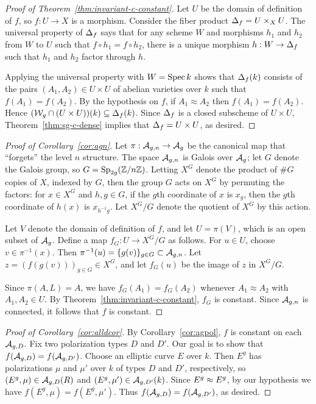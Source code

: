 \documentclass{amsart}
\begin{document}
\begin{proof}[Proof of Theorem~\ref{thm:invariant-c-constant}]
  Let $U$ be the domain of definition of $f$, so $f: U \to X$ is a morphism. Consider the fiber product $\Delta_f = U \times_X U$.
  The universal property of $\Delta_f$ says that for any scheme $W$ and morphisms $h_1$ and $h_2$ from $W$ to $U$ such that $f \circ h_1 = f \circ h_2$, there is a unique morphism $h: W \to \Delta_f$ such that $h_1$ and $h_2$ factor through $h$.

  Applying the universal property with $W = \operatorname{Spec} k$ shows that $\Delta_f(k)$ consists of the pairs $(A_1,A_2) \in U \times U$ of abelian varieties over $k$ such that $f(A_1) = f(A_2)$.
  By the hypothesis on $f$, if $A_1 \approx A_2$ then $f(A_1) = f(A_2)$. Hence $(\mathcal{W}_g \cap (U \times U))(k) \subseteq \Delta_f(k)$.
  Since $\Delta_f$ is a closed subscheme of $U \times U$, Theorem~\ref{thm:sg-c-dense} implies that $\Delta_f = U \times U$, as desired.
\end{proof}

\begin{proof}[Proof of Corollary~\ref{cor:agn}]
  Let $\pi: \mathcal{A}_{g,n} \to \mathcal{A}_g$ be the canonical map that ``forgets'' the level $n$ structure. The space $\mathcal{A}_{g,n}$ is Galois over $\mathcal{A}_g$; let $G$ denote the Galois group, so %
  $G = \operatorname{Sp}_{2g}(\mathbb{Z}/n\mathbb{Z})$. Letting $X^G$ denote the product of $\# G$ copies of $X$, indexed by $G$, then the group $G$ acts on $X^G$ by permuting the factors: for $x \in X^G$ and $h,g \in G$, if the $g$th coordinate of $x$ is $x_g$, then the $g$th coordinate of $h(x)$ is $x_{h^{-1}g}$.
  Let $X^G/G$ denote the quotient of $X^G$ by this action.

  Let $V$ denote the domain of definition of $f$, and let $U = \pi(V)$, which is an open subset of $\mathcal{A}_g$. Define a map $f_G: U \to X^G/G$ as follows. For $u \in U$, choose  $v \in \pi^{-1}(x)$. Then $\pi^{-1}(u) = \{g(v)\}_{g \in G} \subset \mathcal{A}_{g,n}$. Let $z = (f(g(v)))_{g \in G} \in X^G$, and let $f_G(u)$ be the image of $z$ in $X^G/G$.

  Since $\pi(A,L) = A$, we have $f_G(A_1) = f_G(A_2)$ whenever $A_1 \approx A_2$ with $A_1,A_2 \in U$. By Theorem~\ref{thm:invariant-c-constant}, $f_G$ is constant. Since $\mathcal{A}_{g,n}$ is connected, it follows that $f$ is constant.
\end{proof}

\begin{proof}[Proof of Corollary~\ref{cor:alldcor}]
  By Corollary~\ref{cor:agpol}, $f$ is constant on each $\mathcal{A}_{g,{D}}$.
 Fix two polarization types $D$ and $D'$. Our goal is to show that $f(\mathcal{A}_{g,{D}}) = f(\mathcal{A}_{g,{D'}})$. Choose an elliptic curve $E$ over $k$. Then $E^g$ has polarizations $\mu$ and $\mu'$ over $k$ of types $D$ and $D'$, respectively, so $(E^g, \mu) \in \mathcal{A}_{g,{D}}(R)$ and $(E^g,\mu') \in \mathcal{A}_{g,{D'}}(k)$. Since $E^g \approx E^g$, by our hypothesis we have $f(E^g, \mu) = f(E^g, \mu')$. Thus $f(\mathcal{A}_{g,{D}}) = f(\mathcal{A}_{g,{D'}})$, as desired.
\end{proof}
\end{document}
